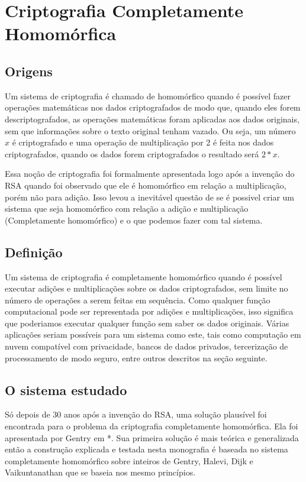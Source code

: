 \chapter{Criptografia Completamente Homomórfica}
\label{revisao}

\section{Origens}
Um sistema de criptografia é chamado de homomórfico quando é possível fazer operações matemáticas nos dados criptografados de modo que, quando eles forem descriptografados, as operações matemáticas foram aplicadas aos dados originais, sem que informações sobre o texto original tenham vazado.
Ou seja, um número $x$ é criptografado e uma operação de multiplicação por 2 é feita nos dados criptografados, quando os dados forem criptografados o resultado será $2*x$.

Essa noção de criptografia foi formalmente apresentada logo após a invenção do RSA quando foi observado que ele é homomórfico em relação a multiplicação, porém não para adição.
Isso levou a inevitável questão de se é possivel criar um sistema que seja homomórfico com relação a adição e multiplicação (Completamente homomórfico) e o que podemos fazer com tal sistema.

\section{Definição}
Um sistema de criptografia é completamente homomórfico quando é possível executar adições e multiplicações sobre os dados criptografados, sem limite no número de operações a serem feitas em sequência.
	Como qualquer função computacional pode ser representada por adições e multiplicações, isso significa que poderiamos executar qualquer função sem saber os dados originais. Várias aplicações seriam possíveis para um sistema como este, tais como computação em nuvem compatível com privacidade, bancos de dados privados, tercerização de processamento de modo seguro, entre outros descritos na seção seguinte.
	
\section{O sistema estudado}
Só depois de 30 anos após a invenção do RSA, uma solução plausível foi encontrada para o problema da criptografia completamente homomórfica. Ela foi apresentada por Gentry em *. Sua primeira solução é mais teórica e generalizada então a construção explicada e testada nesta monografia é baseada no sistema completamente homomórfico sobre inteiros de Gentry, Halevi, Dijk e Vaikuntanathan que se baseia nos mesmo princípios.
